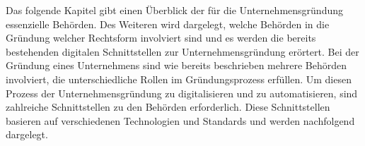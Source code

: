 

Das folgende Kapitel gibt einen Überblick der für die Unternehmensgründung essenzielle Behörden.  Des Weiteren wird dargelegt, welche Behörden in die Gründung welcher Rechtsform involviert sind und  es werden die bereits bestehenden digitalen Schnittstellen zur Unternehmensgründung erörtert.
Bei der Gründung eines Unternehmens sind wie bereits beschrieben mehrere Behörden involviert, die unterschiedliche Rollen im Gründungsprozess erfüllen. Um diesen Prozess der Unternehmensgründung zu digitalisieren und zu automatisieren, sind zahlreiche Schnittstellen zu den Behörden erforderlich. Diese Schnittstellen basieren auf verschiedenen Technologien und Standards und werden nachfolgend dargelegt.
